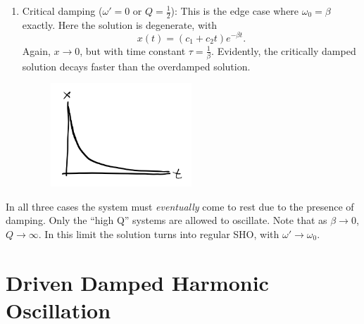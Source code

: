 \documentclass[
  letterpaper,
  DIV=11,
  numbers=noendperiod]{scrreprt}
\begin{document}
\begin{enumerate}
\begin{figure}
{  }

  \end{figure}
\item
  Critical damping (\(\omega' = 0\) or \(Q = \frac{1}{2}\)): This is the
  edge case where \(\omega_0 = \beta\) exactly. Here the solution is
  degenerate, with \[
  x(t) = (c_1 + c_2 t) e^{-\beta t}.
  \] Again, \(x \rightarrow 0\), but with time constant
  \(\tau = \frac{1}{\beta}\). Evidently, the critically damped solution
  decays faster than the overdamped solution.

  \begin{figure}

  {\centering \includegraphics[width=2.08333in,height=\textheight]{classical-mechanics/./resources/image-20230215123225987.png}

  }

  \end{figure}
\end{enumerate}

In all three cases the system must \emph{eventually} come to rest due to
the presence of damping. Only the ``high Q'' systems are allowed to
oscillate. Note that as \(\beta \rightarrow 0\),
\(Q \rightarrow \infty\). In this limit the solution turns into regular
SHO, with \(\omega' \rightarrow \omega_0\).

\hypertarget{driven-damped-harmonic-oscillation}{%
\section{Driven Damped Harmonic
Oscillation}\label{driven-damped-harmonic-oscillation}}
\end{document}
